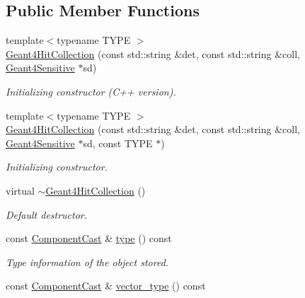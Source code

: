 \subsection*{Public Member Functions}
\begin{DoxyCompactItemize}
\item 
{\footnotesize template$<$typename TYPE $>$ }\\\hyperlink{class_d_d4hep_1_1_simulation_1_1_geant4_hit_collection_a44b9a5315be35dd719cac956ff6f7417}{Geant4HitCollection} (const std::string \&det, const std::string \&coll, \hyperlink{class_d_d4hep_1_1_simulation_1_1_geant4_sensitive}{Geant4Sensitive} $\ast$sd)
\begin{DoxyCompactList}\small\item\em Initializing constructor (C++ version). \item\end{DoxyCompactList}\item 
{\footnotesize template$<$typename TYPE $>$ }\\\hyperlink{class_d_d4hep_1_1_simulation_1_1_geant4_hit_collection_a747970f0854957004594f49ad45db23f}{Geant4HitCollection} (const std::string \&det, const std::string \&coll, \hyperlink{class_d_d4hep_1_1_simulation_1_1_geant4_sensitive}{Geant4Sensitive} $\ast$sd, const TYPE $\ast$)
\begin{DoxyCompactList}\small\item\em Initializing constructor. \item\end{DoxyCompactList}\item 
virtual \hyperlink{class_d_d4hep_1_1_simulation_1_1_geant4_hit_collection_a2e586ee3c0a22239858669a4d310e386}{$\sim$Geant4HitCollection} ()
\begin{DoxyCompactList}\small\item\em Default destructor. \item\end{DoxyCompactList}\item 
const \hyperlink{class_d_d4hep_1_1_component_cast}{ComponentCast} \& \hyperlink{class_d_d4hep_1_1_simulation_1_1_geant4_hit_collection_a263640a2e743c7c59bc497c456fe735a}{type} () const 
\begin{DoxyCompactList}\small\item\em Type information of the object stored. \item\end{DoxyCompactList}\item 
const \hyperlink{class_d_d4hep_1_1_component_cast}{ComponentCast} \& \hyperlink{class_d_d4hep_1_1_simulation_1_1_geant4_hit_collection_a59732e13080bb3b440b3f6674743d80a}{vector\_\-type} () const 

\end{DoxyCompactItemize}
